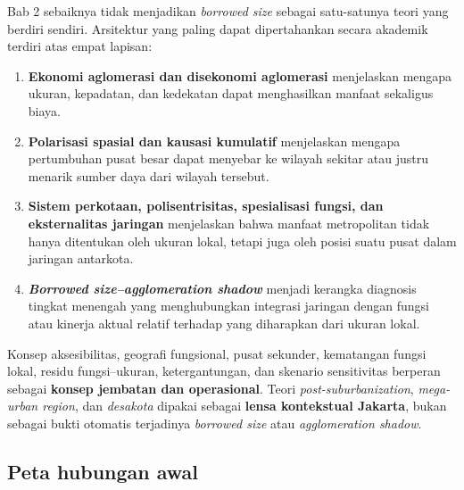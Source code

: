 \documentclass[
  indonesian,
  11pt,
  a4paper,
  oneside,
  openany]{report}
\providecommand{\tightlist}{%
  \setlength{\itemsep}{0pt}\setlength{\parskip}{0pt}}
\begin{document}
Bab 2 sebaiknya tidak menjadikan \emph{borrowed size} sebagai
satu-satunya teori yang berdiri sendiri. Arsitektur yang paling dapat
dipertahankan secara akademik terdiri atas empat lapisan:

\begin{enumerate}
\def\labelenumi{\arabic{enumi}.}
\tightlist
\item
  \textbf{Ekonomi aglomerasi dan disekonomi aglomerasi} menjelaskan
  mengapa ukuran, kepadatan, dan kedekatan dapat menghasilkan manfaat
  sekaligus biaya.
\item
  \textbf{Polarisasi spasial dan kausasi kumulatif} menjelaskan mengapa
  pertumbuhan pusat besar dapat menyebar ke wilayah sekitar atau justru
  menarik sumber daya dari wilayah tersebut.
\item
  \textbf{Sistem perkotaan, polisentrisitas, spesialisasi fungsi, dan
  eksternalitas jaringan} menjelaskan bahwa manfaat metropolitan tidak
  hanya ditentukan oleh ukuran lokal, tetapi juga oleh posisi suatu
  pusat dalam jaringan antarkota.
\item
  \textbf{\emph{Borrowed size--agglomeration shadow}} menjadi kerangka
  diagnosis tingkat menengah yang menghubungkan integrasi jaringan
  dengan fungsi atau kinerja aktual relatif terhadap yang diharapkan
  dari ukuran lokal.
\end{enumerate}

Konsep aksesibilitas, geografi fungsional, pusat sekunder, kematangan
fungsi lokal, residu fungsi--ukuran, ketergantungan, dan skenario
sensitivitas berperan sebagai \textbf{konsep jembatan dan operasional}.
Teori \emph{post-suburbanization}, \emph{mega-urban region}, dan
\emph{desakota} dipakai sebagai \textbf{lensa kontekstual Jakarta},
bukan sebagai bukti otomatis terjadinya \emph{borrowed size} atau
\emph{agglomeration shadow}.

\subsection{Peta hubungan awal}\label{peta-hubungan-awal}
\end{document}
